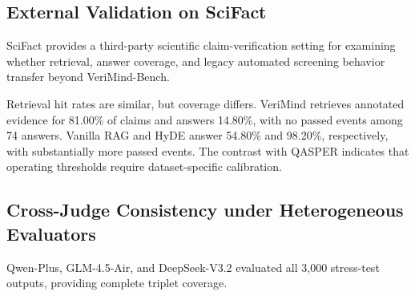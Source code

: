 \documentclass[smallextended]{svjour3}
\begin{document}
\subsection{External Validation on SciFact}
\label{subsec:scifact_results}
SciFact provides a third-party scientific claim-verification setting for examining whether retrieval, answer coverage, and legacy automated screening behavior transfer beyond VeriMind-Bench.

\begin{table}[htbp]
\centering
\caption{SciFact results with retrieval and answer coverage reported separately.}
\label{tab:scifact_results}
\renewcommand{\arraystretch}{1.15}
\end{table}

Retrieval hit rates are similar, but coverage differs. VeriMind retrieves annotated evidence for 81.00\% of claims and answers 14.80\%, with no passed events among 74 answers. Vanilla RAG and HyDE answer 54.80\% and 98.20\%, respectively, with substantially more passed events. The contrast with QASPER indicates that operating thresholds require dataset-specific calibration.

\subsection{Cross-Judge Consistency under Heterogeneous Evaluators}
\label{subsec:cross_judge_results}

Qwen-Plus, GLM-4.5-Air, and DeepSeek-V3.2 evaluated all 3,000 stress-test outputs, providing complete triplet coverage.

\begin{table}[htbp]
\centering
\caption{Cross-Judge Agreement Statistics across Qwen, GLM, and DeepSeek}
\label{tab:cross_judge_agreement}
\renewcommand{\arraystretch}{1.15}
\end{table}
\end{document}
